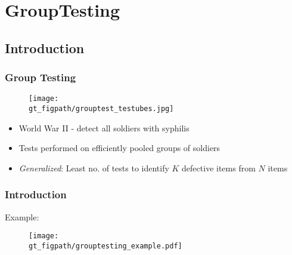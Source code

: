 \section{GroupTesting}
\subsection{Introduction}
\begin{frame}\frametitle{Group Testing}
	\begin{figure}[t]
		\centering
		\texttt{[image: \\gt\_figpath/grouptest\_testubes.jpg]}
	\end{figure}

\begin{itemize}
	\item World War II - detect all soldiers with syphilis
	\item Tests performed on efficiently pooled groups of soldiers
	\pause
	\item \emph{Generalized}: Least no. of tests to identify $K$ defective items from $N$ items
\end{itemize}	

\end{frame}

\begin{frame}\frametitle{Introduction}
Example:
\vspace{-0.3in}
	\begin{figure}[t]
		\centering
		\texttt{[image: \\gt\_figpath/grouptesting\_example.pdf]}
	\end{figure}
\end{frame}

